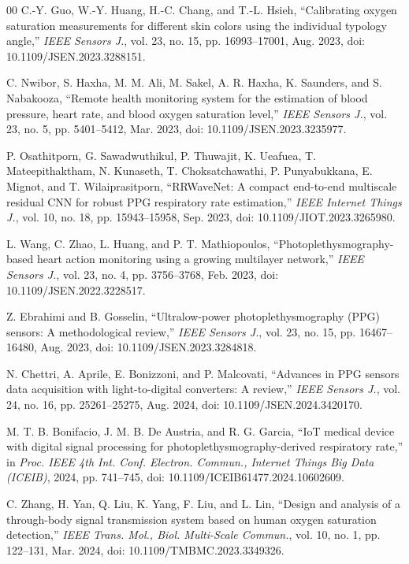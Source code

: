 \documentclass{ieeeaccess}
\begin{document}
\begin{thebibliography}{00}
 C.-Y. Guo, W.-Y. Huang, H.-C. Chang, and T.-L. Hsieh, ``Calibrating oxygen saturation measurements for different skin colors using the individual typology angle,'' \emph{IEEE Sensors J.}, vol. 23, no. 15, pp. 16993--17001, Aug. 2023, doi: 10.1109/JSEN.2023.3288151.

 C. Nwibor, S. Haxha, M. M. Ali, M. Sakel, A. R. Haxha, K. Saunders, and S. Nabakooza, ``Remote health monitoring system for the estimation of blood pressure, heart rate, and blood oxygen saturation level,'' \emph{IEEE Sensors J.}, vol. 23, no. 5, pp. 5401--5412, Mar. 2023, doi: 10.1109/JSEN.2023.3235977.

 P. Osathitporn, G. Sawadwuthikul, P. Thuwajit, K. Ueafuea, T. Mateepithaktham, N. Kunaseth, T. Choksatchawathi, P. Punyabukkana, E. Mignot, and T. Wilaiprasitporn, ``RRWaveNet: A compact end-to-end multiscale residual CNN for robust PPG respiratory rate estimation,'' \emph{IEEE Internet Things J.}, vol. 10, no. 18, pp. 15943--15958, Sep. 2023, doi: 10.1109/JIOT.2023.3265980.

 L. Wang, C. Zhao, L. Huang, and P. T. Mathiopoulos, ``Photoplethysmography-based heart action monitoring using a growing multilayer network,'' \emph{IEEE Sensors J.}, vol. 23, no. 4, pp. 3756--3768, Feb. 2023, doi: 10.1109/JSEN.2022.3228517.

 Z. Ebrahimi and B. Gosselin, ``Ultralow-power photoplethysmography (PPG) sensors: A methodological review,'' \emph{IEEE Sensors J.}, vol. 23, no. 15, pp. 16467--16480, Aug. 2023, doi: 10.1109/JSEN.2023.3284818.

 N. Chettri, A. Aprile, E. Bonizzoni, and P. Malcovati, ``Advances in PPG sensors data acquisition with light-to-digital converters: A review,'' \emph{IEEE Sensors J.}, vol. 24, no. 16, pp. 25261--25275, Aug. 2024, doi: 10.1109/JSEN.2024.3420170.

 M. T. B. Bonifacio, J. M. B. De Austria, and R. G. Garcia, ``IoT medical device with digital signal processing for photoplethysmography-derived respiratory rate,'' in \emph{Proc. IEEE 4th Int. Conf. Electron. Commun., Internet Things Big Data (ICEIB)}, 2024, pp. 741--745, doi: 10.1109/ICEIB61477.2024.10602609.

 C. Zhang, H. Yan, Q. Liu, K. Yang, F. Liu, and L. Lin, ``Design and analysis of a through-body signal transmission system based on human oxygen saturation detection,'' \emph{IEEE Trans. Mol., Biol. Multi-Scale Commun.}, vol. 10, no. 1, pp. 122--131, Mar. 2024, doi: 10.1109/TMBMC.2023.3349326.


\end{thebibliography}
\end{document}

